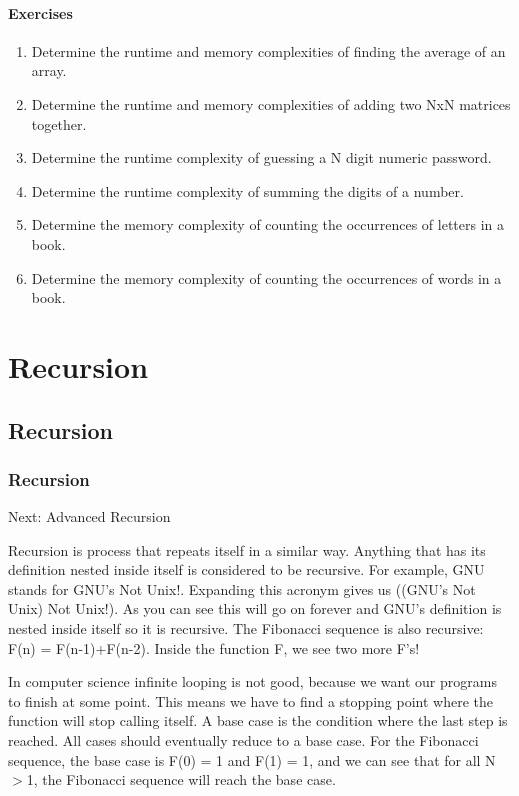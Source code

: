 \documentclass[11pt,oneside]{book}
\begin{document}
\subsection{Exercises}

\begin{enumerate}
\item Determine the runtime and memory complexities of finding the average of an array.
\item Determine the runtime and memory complexities of adding two NxN matrices together.
\item Determine the runtime complexity of guessing a N digit numeric password.
\item Determine the runtime complexity of summing the digits of a number.
\item Determine the memory complexity of counting the occurrences of letters in a book.
\item Determine the memory complexity of counting the occurrences of words in a book.
\end{enumerate}

\part{ Recursion }
    \chapter{ Recursion }
        \section{ Recursion }
        

Next: Advanced Recursion

Recursion is process that repeats itself in a similar way. Anything that has its definition nested inside itself is considered to be recursive. For example, GNU stands for GNU's Not Unix!. Expanding this acronym gives us ((GNU's Not Unix) Not Unix!). As you can see this will go on forever and GNU's definition is nested inside itself so it is recursive. The Fibonacci sequence is also recursive: F(n) = F(n-1)+F(n-2). Inside the function F, we see two more F's!

In computer science infinite looping is not good, because we want our programs to finish at some point. This means we have to find a stopping point where the function will stop calling itself. A base case is the condition where the last step is reached. All cases should eventually reduce to a base case. For the Fibonacci sequence, the base case is F(0) = 1 and F(1) = 1, and we can see that for all N$>$1, the Fibonacci sequence will reach the base case.
\end{document}
